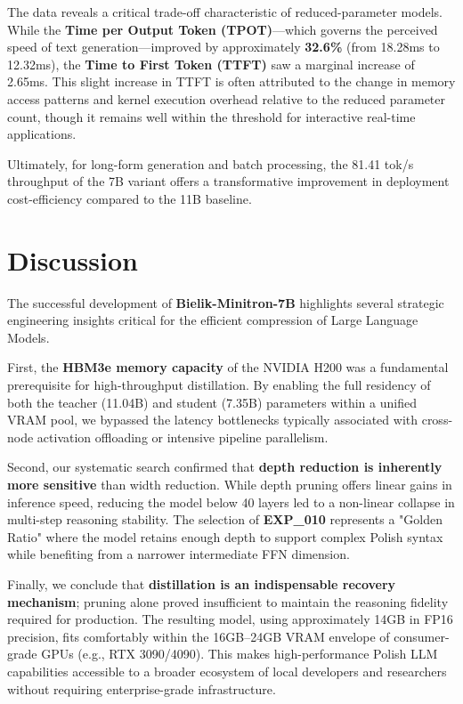 \documentclass{article}
\begin{document}
The data reveals a critical trade-off characteristic of reduced-parameter models. While the \textbf{Time per Output Token (TPOT)}—which governs the perceived speed of text generation—improved by approximately \textbf{32.6\%} (from 18.28ms to 12.32ms), the \textbf{Time to First Token (TTFT)} saw a marginal increase of 2.65ms. This slight increase in TTFT is often attributed to the change in memory access patterns and kernel execution overhead relative to the reduced parameter count, though it remains well within the threshold for interactive real-time applications. 

Ultimately, for long-form generation and batch processing, the 81.41 tok/s throughput of the 7B variant offers a transformative improvement in deployment cost-efficiency compared to the 11B baseline.

\section{Discussion}
The successful development of \textbf{Bielik-Minitron-7B} highlights several strategic engineering insights critical for the efficient compression of Large Language Models. 

First, the \textbf{HBM3e memory capacity} of the NVIDIA H200 was a fundamental prerequisite for high-throughput distillation. By enabling the full residency of both the teacher (11.04B) and student (7.35B) parameters within a unified VRAM pool, we bypassed the latency bottlenecks typically associated with cross-node activation offloading or intensive pipeline parallelism.

Second, our systematic search confirmed that \textbf{depth reduction is inherently more sensitive} than width reduction. While depth pruning offers linear gains in inference speed, reducing the model below 40 layers led to a non-linear collapse in multi-step reasoning stability. The selection of \textbf{EXP\_010} represents a "Golden Ratio" where the model retains enough depth to support complex Polish syntax while benefiting from a narrower intermediate FFN dimension.

Finally, we conclude that \textbf{distillation is an indispensable recovery mechanism}; pruning alone proved insufficient to maintain the reasoning fidelity required for production. The resulting model, using approximately 14GB in FP16 precision, fits comfortably within the 16GB--24GB VRAM envelope of consumer-grade GPUs (e.g., RTX 3090/4090). This makes high-performance Polish LLM capabilities accessible to a broader ecosystem of local developers and researchers without requiring enterprise-grade infrastructure.
\end{document}
